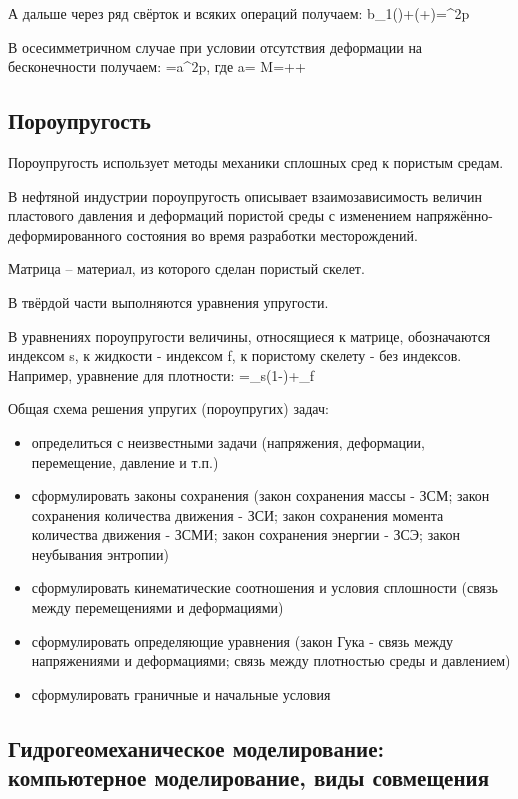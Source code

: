 \documentclass[main.tex]{subfiles}
\begin{document}
А дальше через ряд свёрток и всяких операций получаем:
\beq
b_1(\pmb{\varepsilon})+\left(+\right)=\pmb{\nabla}^2p
\eeq

В осесимметричном случае при условии отсутствия деформации на бесконечности получаем:
\beq
{}=a\pmb{\nabla}^2p,
\eeq
где
\beq
a= M=++
\eeq

\subsection{Пороупругость}

Пороупругость использует методы механики сплошных сред к пористым средам.

В нефтяной индустрии пороупругость описывает взаимозависимость величин пластового давления и деформаций пористой среды с изменением напряжённо-деформированного состояния во время разработки месторождений.

Матрица -- материал, из которого сделан пористый скелет.

В твёрдой части выполняются уравнения упругости.

В уравнениях пороупругости величины, относящиеся к матрице, обозначаются индексом s, к жидкости - индексом f, к пористому скелету - без индексов.
Например, уравнение для плотности:
\beq
\rho=\rho_s\left(1-\varphi\right)+\rho_f\varphi
\eeq

Общая схема решения упругих (пороупругих) задач:
\begin{itemize}
\item определиться с неизвестными задачи (напряжения, деформации, перемещение, давление и т.п.)
\item сформулировать законы сохранения (закон сохранения массы - ЗСМ; закон сохранения количества движения - ЗСИ; закон сохранения момента количества движения - ЗСМИ; закон сохранения энергии - ЗСЭ; закон неубывания энтропии)
\item сформулировать кинематические соотношения и условия сплошности (связь между перемещениями и деформациями)
\item сформулировать определяющие уравнения (закон Гука - связь между напряжениями и деформациями; связь между плотностью среды и давлением)
\item сформулировать граничные и начальные условия
\end{itemize}

\subsection{Гидрогеомеханическое моделирование: компьютерное моделирование, виды совмещения}
\end{document}
